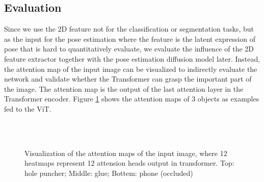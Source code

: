\documentclass[12pt,DIV14,BCOR12mm,a4paper,footinclude=false,headinclude,parskip=half-,twoside,openright,cleardoublepage=empty,toc=index,bibliography=totoc,listof=totoc]{scrreprt}
\numberwithin{equation}{chapter}
\begin{document}
\subsection{Evaluation}
Since we use the 2D feature not for the classification or segmentation tasks, but as the input for the pose estimation where the feature is the latent expression of pose that is hard to quantitatively evaluate, we evaluate the influence of the 2D feature extractor together with the pose estimation diffusion model later. Instead, the attention map of the input image can be visualized to indirectly evaluate the network and validate whether the Transformer can grasp the important part of the image. The attention map is the output of the last attention layer in the Transformer encoder. Figure \ref{img:atten} shows the attention maps of 3 objects as examples fed to the ViT.

\begin{figure}[h]
  \centering
   \\
  \centering
   \\
  \centering
  \caption{Visualization of the attention maps of the input image, where 12 heatmaps represent 12 attension heads output in transformer. Top: hole puncher; Middle: glue; Bottem: phone (occluded)}
  \label{img:atten}
\end{figure}
\end{document}

